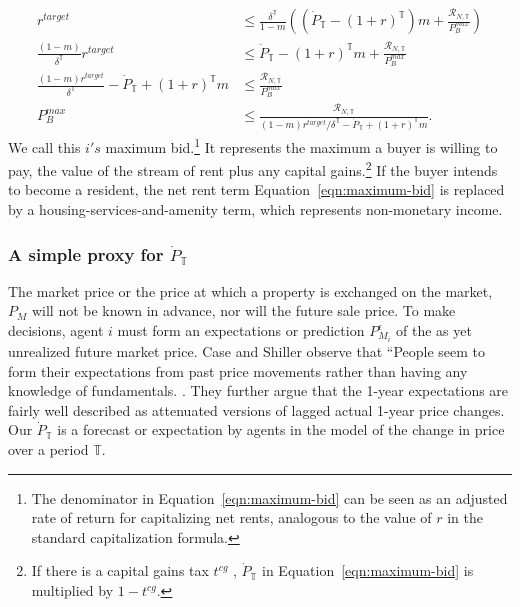 \begin{align}
r^{target}& \le \frac{\delta^\mathbb{T}}{1-m} \left((\dot P_\mathbb{T} - (1+r)^\mathbb{T})m  + \frac{\mathcal{R}_{N, \mathbb{T}}}{P_B^{max}}\right)\nonumber\\
\frac{(1-m)}{\delta^\mathbb{T}}r^{target} &\le \dot P_\mathbb{T} - (1+r)^\mathbb{T}m  +   \frac{\mathcal{R}_{N, \mathbb{T}}}{P_B^{max}} \nonumber\\
\frac{(1-m)r^{target}}{\delta^\mathbb{T}} - \dot P_\mathbb{T} + (1+r)^\mathbb{T}m &\le  \frac{\mathcal{R}_{N, \mathbb{T}}}{P_B^{max}}\nonumber\\
P_B^{max} &\le  \frac{\mathcal{R}_{N, \mathbb{T}}}{(1-m)r^{target}/\delta^\mathbb{T} - \dot P_\mathbb{T} + (1+r)^\mathbb{T}m}. \label{eqn:maximum-bid}
\end{align}
We call this  $i's$ maximum bid.\footnote{The denominator in Equation~\ref{eqn:maximum-bid} can be seen as an adjusted rate of return for capitalizing net rents, analogous to the value of $r$ in the standard capitalization formula.} 
It represents the maximum a buyer is willing to pay, the value of the stream of rent plus any capital gains.\footnote{If there is a capital gains tax $t^{cg}$ , $\dot P_\mathbb{T}$ in Equation~\ref{eqn:maximum-bid} is multiplied by $1-t^{cg}$. } %
If the buyer intends to become a resident, the net rent term Equation~\ref{eqn:maximum-bid} is replaced by a housing-services-and-amenity term, which represents non-monetary income. %

\subsubsection{A simple proxy for $\dot P_\mathbb{T}$}

The \gls{market price} or the price at which a property is exchanged on the market, $P_M$ will not be known in advance, nor will the future sale price.  To make decisions, agent $i$ must form an \glspl{expectation} or prediction $P_{M_i}^{\epsilon}$ of the as yet unrealized future market price. Case and Shiller observe that ``People seem to form their expectations from past price movements rather than having any knowledge of fundamentals. \cite{caseThereBubbleHousing2003}. They further argue that the 1-year expectations are fairly well described as attenuated versions of lagged actual 1-year price changes. Our $\dot P_\mathbb{T}$ is a forecast or expectation by agents in the model of the change in price over a period $\mathbb{T}$.

